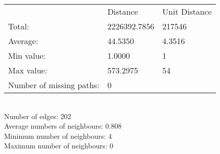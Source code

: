 \begin{tabular}{lll}
 & Distance & Unit Distance\\
Total: & 2226392.7856 & 217546\\
Average: & 44.5350 & 4.3516\\
Min value: & 1.0000 & 1\\
Max value: & 573.2975 & 54\\
\hline
Number of missing paths: & 0 &\\
\end{tabular}\\
Number of edges: 202\\
Average numbers of neighbours: 0.808\\
Minimum number of neighbours: 4\\
Maximum number of neighbours: 0\\
